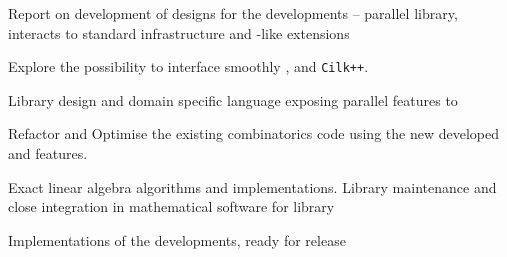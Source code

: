 \begin{workpackage}
\begin{wpdelivs}
\begin{wpdeliv}[due=18,id=FFT,dissem=PU,nature=DEM, lead=UK]
\end{wpdeliv}
  \begin{wpdeliv}[due=18,id=GAP-hpc-report,dissem=PU,nature=R,lead=SA]
    {Report on development of designs for the \GAP developments --
      parallel library, interacts to standard infrastructure and
      \Cython-like extensions }
  \end{wpdeliv}
  \begin{wpdeliv}[due=24,id=cython-pythran-cilk,dissem=PU,nature=DEM,lead=PS]
      {Explore the possibility to interface smoothly \Pythran, \Cython and \texttt{Cilk++}.}
\end{wpdeliv}
  \begin{wpdeliv}[due=24,id=LinBox-DSL,dissem=PU,nature=R,lead=UJF]
    {Library design and domain specific language exposing \Linbox parallel features to \Sage}
  \end{wpdeliv}
  \begin{wpdeliv}[due=36,id=sage-HPCcombi,dissem=PU,nature=DEM,lead=UB]
      {Refactor and Optimise the existing combinatorics \Sage code using the new developed \Pythran and \Cython features.}
  \end{wpdeliv}
  \begin{wpdeliv}[due=36,id=LinBox-algo,dissem=PU,nature=DEM, lead=UJF]
    {Exact linear algebra algorithms and implementations. Library maintenance and close integration
      in mathematical software for \Linbox library}
  \end{wpdeliv}
  \begin{wpdeliv}[due=47,id=GAP-software-final,dissem=PU,nature=OTHER,lead=SA]
      {Implementations of the \GAP developments, ready for release}

\end{wpdeliv}
\end{wpdelivs}
\end{workpackage}
